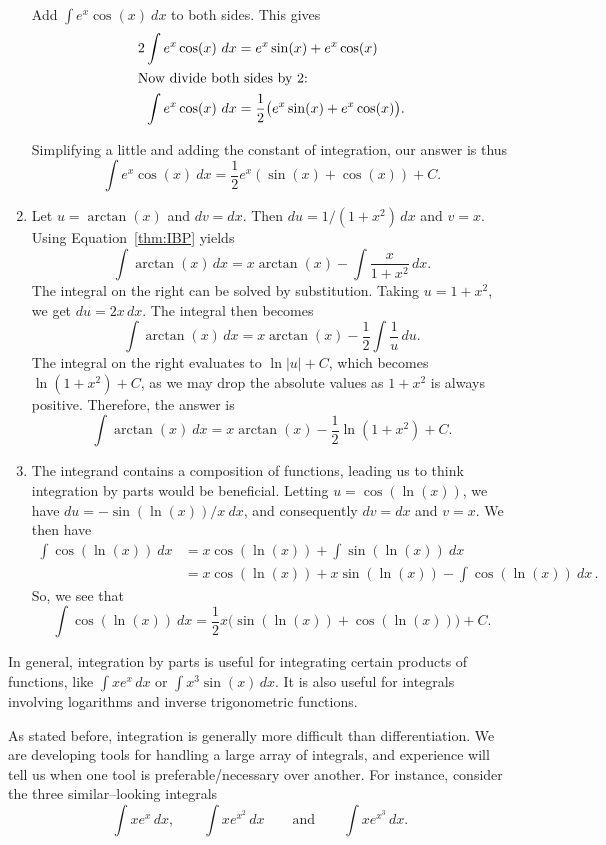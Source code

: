 \begin{example}
\begin{enumerate}
Add $\int e^x\cos(x)\ dx$ to both sides. This gives 
\begin{align*}
2\int e^x\cos(x)\ dx & = e^x\sin(x) + e^x\cos(x) \\
\intertext{Now divide both sides by 2:}
\int e^x\cos(x)\ dx & = \frac{1}{2}\big(e^x\sin(x) + e^x\cos(x)\big).
\end{align*}

Simplifying a little and adding the constant of integration, our answer is thus
$$\int e^x\cos(x)\ dx = \frac12e^x\left(\sin(x) + \cos(x)\right)+C.$$
\item  Let $u=\arctan(x)$ and $dv=dx$.  Then $du=1/(1+x^2)\,dx$ and $v=x$.  Using Equation~\eqref{thm:IBP} yields
$$\int \arctan(x) \,dx = x\arctan(x) - \int \frac x{1+x^2}\,dx.$$
The integral on the right can be solved by substitution.  Taking $u=1+x^2$, we get $du=2x\,dx$.  The integral then becomes
$$\int \arctan(x) \,dx = x\arctan(x) - \frac12\int \frac 1{u}\,du.$$
The integral on the right evaluates to $\ln|u|+C$, which becomes $\ln(1+x^2)+C$, as we may drop the absolute values as $1+x^2$ is always positive.  Therefore, the answer is
$$\int \arctan(x)\ dx = x\arctan(x) - \frac12\ln(1+x^2) + C.$$
\item The integrand contains a composition of functions, leading us to think integration by parts would be beneficial. Letting $u=\cos\left(\ln(x)\right)$, we have $du = -\sin\left(\ln(x)\right)/x\ dx$, and consequently $dv=dx$ and $v=x$. We then have
\begin{align*}
\int \cos(\ln(x))\ dx &= x\cos(\ln(x))+\int \sin(\ln(x))\ dx \\[0.2cm]
				&= x\cos(\ln(x))+x\sin(\ln(x))-\int \cos(\ln(x))\ dx\,.
				\end{align*}
So, we see that 
$$
\int \cos(\ln(x))\ dx=\frac{1}{2}x \big(\sin(\ln(x)) + \cos (\ln(x))\big)+C.
$$
\end{enumerate}
\end{example}

In general, integration by parts is useful for integrating certain products of functions, like $\int x e^x\,dx$ or $\int x^3\sin(x)\,dx$.   It is also useful for integrals involving logarithms and inverse trigonometric functions.  

As stated before, integration is generally more difficult than differentiation. We are developing tools for handling a large array of integrals, and experience will tell us when one tool is preferable/necessary over another. For instance, consider the three similar--looking integrals 
$$\int xe^x\,dx, \qquad  \int x e^{x^2}\,dx \qquad \text{and} \qquad \int xe^{x^3}\,dx.$$

